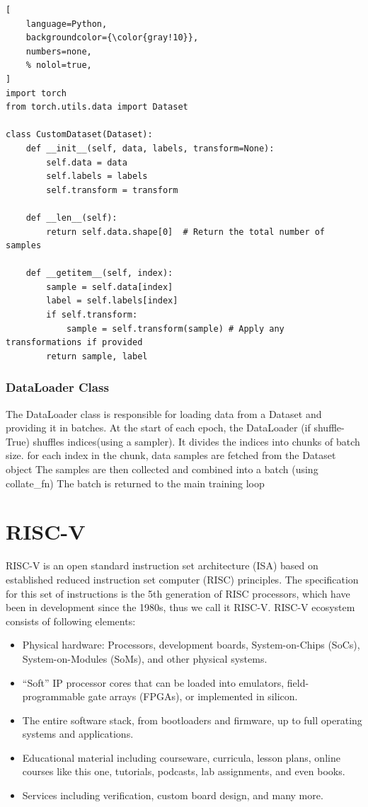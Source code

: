 \documentclass[12pt, a4paper]{article}
\begin{document}
\begin{lstlisting}[
    language=Python,
    backgroundcolor={\color{gray!10}},
    numbers=none,
    % nolol=true,
]
import torch
from torch.utils.data import Dataset

class CustomDataset(Dataset):
    def __init__(self, data, labels, transform=None):
        self.data = data
        self.labels = labels
        self.transform = transform

    def __len__(self):
        return self.data.shape[0]  # Return the total number of samples

    def __getitem__(self, index):
        sample = self.data[index]
        label = self.labels[index]
        if self.transform:
            sample = self.transform(sample) # Apply any transformations if provided
        return sample, label
\end{lstlisting}

\subsubsection{DataLoader Class}

The DataLoader class is responsible for loading data from a Dataset and providing it in batches. 
At the start of each epoch, the DataLoader (if shuffle-True) shuffles indices(using a sampler). It divides the indices into chunks of batch size. for each index in the chunk, data samples are fetched from the Dataset object The samples are then collected and combined into a batch (using collate\_fn) The batch is returned to the main training loop

\section{RISC-V}

RISC-V is an open standard instruction set architecture (ISA) based on established reduced instruction set computer (RISC) principles. The specification for this set of instructions is the 5th generation of RISC processors, which have been in development since the 1980s, thus we call it RISC-V. RISC-V ecosystem consists of following elements:
\begin{itemize}
    \item Physical hardware: Processors, development boards, System-on-Chips (SoCs), System-on-Modules (SoMs), and other physical systems.
    \item ``Soft'' IP processor cores that can be loaded into emulators, field-programmable gate arrays (FPGAs), or implemented in silicon.
    \item The entire software stack, from bootloaders and firmware, up to full operating systems and applications.
    \item Educational material including courseware, curricula, lesson plans, online courses like this one, tutorials, podcasts, lab assignments, and even books.
    \item Services including verification, custom board design, and many more.
\end{itemize} 
\end{document}

